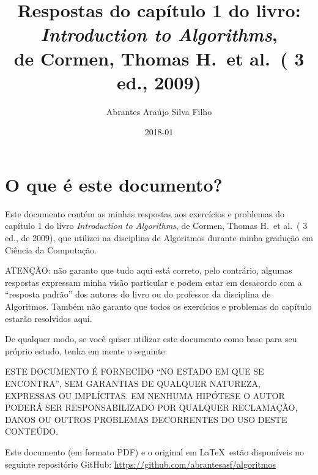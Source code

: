 \documentclass[pdftex,a4paper,12pt,brazil]{article} %
\newcommand{\ordinal}[2]{%
#1%
\ifthenelse{\equal{a}{#2}}%
{\textordfeminine}%
{\textordmasculine}}
\begin{document}
\title{Respostas do capítulo 1 do livro:\\
  \emph{Introduction to Algorithms},\\
  de Cormen, Thomas H.\ et al.\ (\ordinal{3}{a} ed., 2009)}
\author{Abrantes Araújo Silva Filho}
\date{2018-01}
\maketitle
\tableofcontents


\section{O que é este documento?} 
\label{o_que_e}

Este documento contém as minhas respostas aos exercícios e problemas do capítulo 1 do livro
\emph{Introduction to Algorithms}, de Cormen, Thomas H.\ et al.\ (\ordinal{3}{a} ed., de 2009),
que utilizei na disciplina de Algoritmos durante minha gradução em Ciência da Computação.

ATENÇÃO: não garanto que tudo aqui está correto, pelo contrário, algumas respostas expressam
minha visão particular e podem estar em desacordo com
a ``resposta padrão'' dos autores do livro ou do professor da disciplina de Algoritmos. Também
não garanto que todos os exercícios e problemas do capítulo estarão resolvidos aqui.

De qualquer modo, se você quiser
utilizar este documento como base para seu próprio estudo, tenha em mente o seguinte:

ESTE DOCUMENTO É FORNECIDO ``NO ESTADO EM QUE SE ENCONTRA'', SEM GARANTIAS DE QUALQUER
NATUREZA, EXPRESSAS OU IMPLÍCITAS. EM NENHU\-MA HIPÓTESE O AUTOR PODERÁ SER RESPONSABILIZADO POR
QUALQUER RECLAMAÇÃO, DANOS OU OUTROS PROBLEMAS DECORRENTES DO USO DESTE CONTEÚDO.

Este documento (em formato PDF) e o original em \LaTeX\ estão disponíveis no seguinte
repositório GitHub: \url{https://github.com/abrantesasf/algoritmos}
\end{document}
